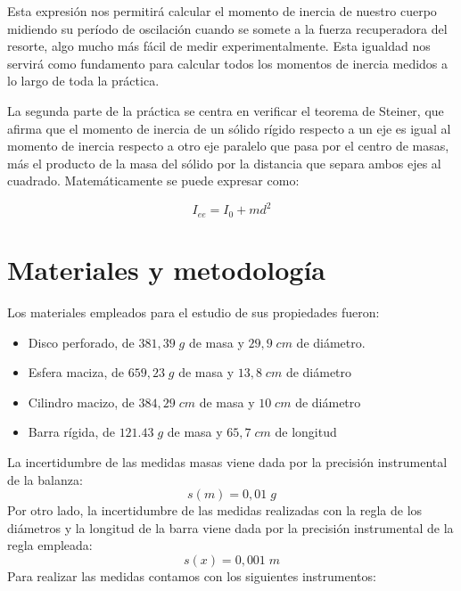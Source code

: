 \documentclass[a4paper,12pt,titlepage]{report}
\begin{document}
Esta expresión nos permitirá calcular el momento de inercia de nuestro cuerpo midiendo su período de oscilación cuando se somete a la fuerza recuperadora del resorte, algo mucho más fácil de medir experimentalmente. Esta igualdad nos servirá como fundamento para calcular todos los momentos de inercia medidos a lo largo de toda la práctica.

\par La segunda parte de la práctica se centra en verificar el teorema de Steiner, que afirma que el momento de inercia de un sólido rígido respecto a un eje es igual al momento de inercia respecto a otro eje paralelo que pasa por el centro de masas, más el producto de la masa del sólido por la distancia que separa ambos ejes al cuadrado. Matemáticamente se puede expresar como:

\begin{equation}
    I_{ee} = I_0 + md^2
    \label{Steiner}
\end{equation}

\section{Materiales y metodología}

Los materiales empleados para el estudio de sus propiedades fueron:

\begin{itemize}
    \item Disco perforado, de $381,39 \;g$ de masa y $29,9 \; cm$ de diámetro.
    \item Esfera maciza, de $659,23 \; g$ de masa y $13,8 \; cm$ de diámetro
    \item Cilindro macizo, de $384,29 \; cm $ de masa y $10 \; cm$ de diámetro
    \item Barra rígida, de $121.43 \;g$ de masa y $65,7 \; cm$ de longitud
\end{itemize}
La incertidumbre de las medidas masas viene dada por la precisión instrumental de la balanza:
\begin{equation}
    s(m) = 0,01 \; g
\end{equation}
Por otro lado, la incertidumbre de las medidas realizadas con la regla de los diámetros y la longitud de la barra viene dada por la precisión instrumental de la regla empleada:
\begin{equation}
    s(x) = 0,001 \;m
\end{equation}
Para realizar las medidas contamos con los siguientes instrumentos:
\end{document}
